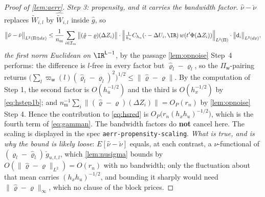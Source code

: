 \begin{proof}[Proof of \cref{lem:aerr}]
\emph{Step 3: propensity, and it carries the bandwidth factor.} $\hat\nu-\breve\nu$ replaces
$\widetilde W_{i,l}$ by $\widehat{\widetilde W}_{i,l}$ inside $\hat g$, so
\[
\big\|\hat\nu-\breve\nu\big\|_{L^{2}(\Pi\otimes dx)}
\le\frac1{n_{\mathrm m}}\sum_{i\in\mathcal I_m}\big\|(\hat\varrho-\varrho)(\Delta Z_i)\big\|\cdot
\Big\|\tfrac1{h_u}C_{h_u}(\cdot-\Delta U_i,\IR)\,w(t'\Phi(\Delta Z_i))\Big\|_{L^{2}(\Pi)}
\cdot\big\|\mathsf d_i\big\|_{L^{2}(dx)} ,
\]
\emph{the first norm Euclidean on $\IR^{\mathsf L-1}$}, by the passage \cref{lem:opnoise} Step~4
performs: the difference is $l$-free in every factor but $\hat\varrho_l-\varrho_l$, so the
$\Pi_{\mathsf w}$-pairing returns
$\big(\sum_l\varpi_{\mathsf w}(l)(\hat\varrho_l-\varrho_l)^{2}\big)^{1/2}\le\|\hat\varrho-\varrho\|$.
By the computation of Step 1, the second factor is $O(h_u^{-1/2})$ and the third is $O(h_x^{-1/2})$ by
\eqref{eq:hstep1b}; and $n_{\mathrm m}^{-1}\sum_i\|(\hat\varrho-\varrho)(\Delta Z_i)\|=O_P(r_n)$ by
\cref{lem:opnoise} Step 4. Hence the contribution to \eqref{eq:hsred} is
$O_P\big(r_n(h_xh_u)^{-1/2}\big)$, which is the fourth term of \eqref{eq:gamman}.
The bandwidth factors do \textbf{not} cancel here. The scaling is displayed in the spec
\texttt{aerr-propensity-scaling}. \emph{What is
true, and is why the bound is likely loose}: $E[\hat\nu-\breve\nu]$ equals, at each contrast, a
$\nu$-functional of
$(\varrho_l-\hat\varrho_l)\,\breve g_{u,t,l}$, which \cref{lem:nusigma} bounds by $O(\|\hat\varrho-\varrho\|_{L^{2}})=O(r_n)$
with no bandwidth; only the fluctuation about that mean carries $(h_xh_u)^{-1/2}$, and bounding it
sharply would need $\|\hat\varrho-\varrho\|_\infty$, which no clause of the block prices.


\end{proof}
